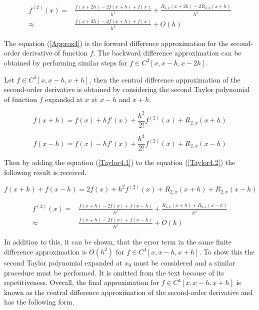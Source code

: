 \begin{equation} \label{Approx4}
 \begin{aligned}
 f^{(2)}(x) =& \frac{f(x + 2h) - 2 f(x + h) + f(x)}{h^2} + \frac{R_{2, x}(x + 2h) - 2 R_{2, x}(x + h)}{h^2} \\
 \approx& \frac{f(x + 2h) - 2 f(x + h) + f(x)}{h^2} + O(h)
 \end{aligned}
\end{equation}

The equation (\ref{Approx4}) is the forward difference approximation for the second-order derivative of function \(f\).
The backward difference approximation can be obtained by performing similar steps for \(f \in C^3[x, x - h, x - 2h]\).

Let \(f \in C^3[x, x - h, x + h]\), then the central difference approximation of the second-order derivative is obtained by considering the second Taylor polynomial of function \(f\) expanded at \(x\) at \(x - h\) and \(x + h\).

\begin{equation} \label{Taylor4.1}
 f(x + h) = f(x) + h f'(x) + \frac{h^2}{2!} f^{(2)}(x) + R_{2, x}(x + h)
 \end{equation}

\begin{equation} \label{Taylor4.2}
 f(x - h) = f(x) - h f'(x) + \frac{h^2}{2!} f^{(2)}(x) + R_{2, x}(x - h)
\end{equation}

Then by adding the equation (\ref{Taylor4.1}) to the equation (\ref{Taylor4.2}) the following result is received.

\begin{equation}
 f(x + h) + f(x - h) = 2 f(x) + h^2 f^{(2)}(x) + R_{2, x}(x + h) + R_{2, x}(x - h)
\end{equation}

\begin{equation} \label{Approx5.parent}
 \begin{aligned}
 f^{(2)}(x) = & \frac{f(x + h) - 2 f(x) + f(x - h)}{h^2} + \frac{R_{2, x}(x + h) + R_{2, x}(x - h)}{h^2} \\
 \approx& \frac{f(x + h) - 2 f(x) + f(x - h)}{h^2} + O(h)
 \end{aligned}
\end{equation}

In addition to this, it can be shown, that the error term in the same finite difference approximation is \(O(h^2)\) for \(f \in C^4[x, x - h, x + h]\).
To show this the second Taylor polynomial expanded at \(x_0\) must be considered and a similar procedure must be performed.
It is omitted from the text because of its repetitiveness.
Overall, the final approximation for \(f \in C^4[x, x - h, x +h]\) is known as the central difference approximation of the second-order derivative and has the following form.

